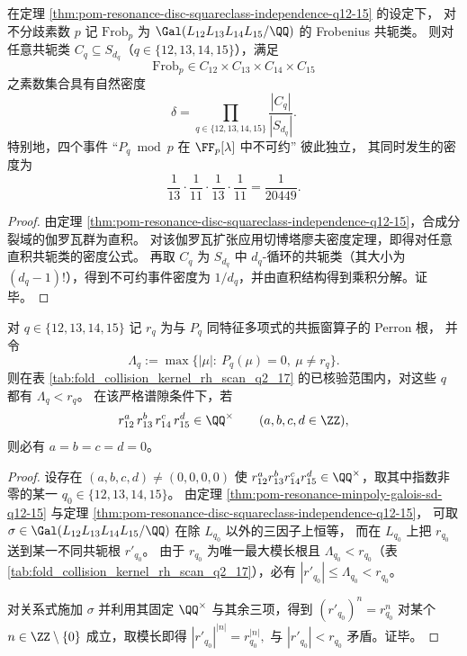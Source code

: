 \begin{corollary}[四多项式分解型的切博塔廖夫完全独立律与显式密度]\label{cor:pom-resonance-chebotarev-product-density-q12-15}
在定理 \ref{thm:pom-resonance-disc-squareclass-independence-q12-15} 的设定下，
对不分歧素数 \(p\) 记 \(\mathrm{Frob}_p\) 为 \(\Gal(L_{12}L_{13}L_{14}L_{15}/\QQ)\) 的 Frobenius 共轭类。
则对任意共轭类 \(C_q\subseteq S_{d_q}\)（\(q\in\{12,13,14,15\}\)），满足
\[
\mathrm{Frob}_p\in C_{12}\times C_{13}\times C_{14}\times C_{15}
\]
之素数集合具有自然密度
\[
\delta=\prod_{q\in\{12,13,14,15\}}\frac{|C_q|}{|S_{d_q}|}.
\]
特别地，四个事件 ``\(P_q\bmod p\) 在 \(\FF_p[\lambda]\) 中不可约'' 彼此独立，
其同时发生的密度为
\[
\frac1{13}\cdot\frac1{11}\cdot\frac1{13}\cdot\frac1{11}=\frac1{20449}.
\]
\end{corollary}
\begin{proof}
由定理 \ref{thm:pom-resonance-disc-squareclass-independence-q12-15}，合成分裂域的伽罗瓦群为直积。
对该伽罗瓦扩张应用切博塔廖夫密度定理，即得对任意直积共轭类的密度公式。
再取 \(C_q\) 为 \(S_{d_q}\) 中 \(d_q\)-循环的共轭类（其大小为 \((d_q-1)!\)），得到不可约事件密度为 \(1/d_q\)，并由直积结构得到乘积分解。证毕。
\end{proof}

\begin{theorem}\label{thm:pom-resonance-perron-multiplicative-independence-q12-15}
对 \(q\in\{12,13,14,15\}\) 记 \(r_q\) 为与 \(P_q\) 同特征多项式的共振窗算子的 Perron 根，
并令
\[
\Lambda_q:=\max\{|\mu|:\ P_q(\mu)=0,\ \mu\neq r_q\}.
\]
则在表 \ref{tab:fold_collision_kernel_rh_scan_q2_17} 的已核验范围内，对这些 \(q\) 都有 \(\Lambda_q<r_q\)。
在该严格谱隙条件下，若
\[
r_{12}^{a}\,r_{13}^{b}\,r_{14}^{c}\,r_{15}^{d}\in\QQ^\times
\qquad(a,b,c,d\in\ZZ),
\]
则必有 \(a=b=c=d=0\)。
\end{theorem}
\begin{proof}
设存在 \((a,b,c,d)\neq (0,0,0,0)\) 使 \(r_{12}^{a}r_{13}^{b}r_{14}^{c}r_{15}^{d}\in\QQ^\times\)，取其中指数非零的某一 \(q_0\in\{12,13,14,15\}\)。
由定理 \ref{thm:pom-resonance-minpoly-galois-sd-q12-15} 与定理 \ref{thm:pom-resonance-disc-squareclass-independence-q12-15}，
可取 \(\sigma\in\Gal(L_{12}L_{13}L_{14}L_{15}/\QQ)\) 在除 \(L_{q_0}\) 以外的三因子上恒等，
而在 \(L_{q_0}\) 上把 \(r_{q_0}\) 送到某一不同共轭根 \(r'_{q_0}\)。
由于 \(r_{q_0}\) 为唯一最大模长根且 \(\Lambda_{q_0}<r_{q_0}\)（表 \ref{tab:fold_collision_kernel_rh_scan_q2_17}），必有 \(|r'_{q_0}|\le \Lambda_{q_0}<r_{q_0}\)。

对关系式施加 \(\sigma\) 并利用其固定 \(\QQ^\times\) 与其余三项，得到
\(
(r'_{q_0})^{n}=r_{q_0}^{n}
\)
对某个 \(n\in\ZZ\setminus\{0\}\) 成立，取模长即得
\(
|r'_{q_0}|^{|n|}=r_{q_0}^{|n|},
\)
与 \(|r'_{q_0}|<r_{q_0}\) 矛盾。证毕。
\end{proof}

